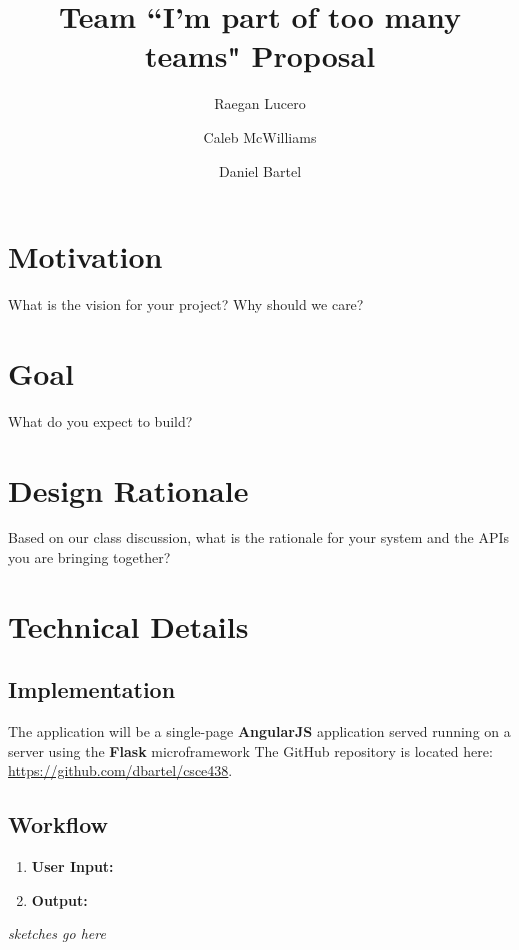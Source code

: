 \documentclass{article}
\title{Team ``I'm part of too many teams" Proposal}
\date{}
\author{
	Raegan Lucero
	\and
	 Caleb McWilliams
	\and
	 Daniel Bartel
 }
\begin{document}
\maketitle

\section*{Motivation}
What is the vision for your project? Why should we care?

\section*{Goal}
What do you expect to build?

\section*{Design Rationale}
Based on our class discussion, what is the rationale for your system and the APIs you are bringing together?
	
\section*{Technical Details}

\subsection*{Implementation}
The application will be a single-page \textbf{AngularJS} application served running on a server using the \textbf{Flask} microframework
The GitHub repository is located here: \url{https://github.com/dbartel/csce438}.

\subsection*{Workflow}
\begin{enumerate}
	\item[\textbullet] \textbf{User Input:}
	\item[\textbullet] \textbf{Output:}
\end{enumerate}
\textit{sketches go here}
\end{document}
